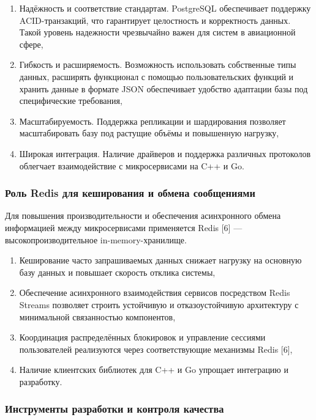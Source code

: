 \documentclass[14pt,a4paper]{extarticle}
\begin{document}
\begin{enumerate}
\item Надёжность и соответствие стандартам. PostgreSQL обеспечивает поддержку ACID-транзакций, что гарантирует целостность и корректность данных. Такой уровень надежности чрезвычайно важен для систем в авиационной сфере,

\item Гибкость и расширяемость. Возможность использовать собственные типы данных, расширять функционал с помощью пользовательских функций и хранить данные в формате JSON обеспечивает удобство адаптации базы под специфические требования,

\item Масштабируемость. Поддержка репликации и шардирования позволяет масштабировать базу под растущие объёмы и повышенную нагрузку,

\item Широкая интеграция. Наличие драйверов и поддержка различных протоколов облегчает взаимодействие с микросервисами на C++ и Go.
\end{enumerate}

\subsubsection{Роль Redis для кеширования и обмена сообщениями}

Для повышения производительности и обеспечения асинхронного обмена информацией между микросервисами применяется Redis [6] — высокопроизводительное in-memory-хранилище.

\begin{enumerate}
\item Кеширование часто запрашиваемых данных снижает нагрузку на основную базу данных и повышает скорость отклика системы,

\item Обеспечение асинхронного взаимодействия сервисов посредством Redis Streams позволяет строить устойчивую и отказоустойчивую архитектуру с минимальной связанностью компонентов,

\item Координация распределённых блокировок и управление сессиями пользователей реализуются через соответствующие механизмы Redis [6],

\item Наличие клиентских библиотек для C++ и Go упрощает интеграцию и разработку.
\end{enumerate}

\subsubsection{Инструменты разработки и контроля качества}
\end{document}
